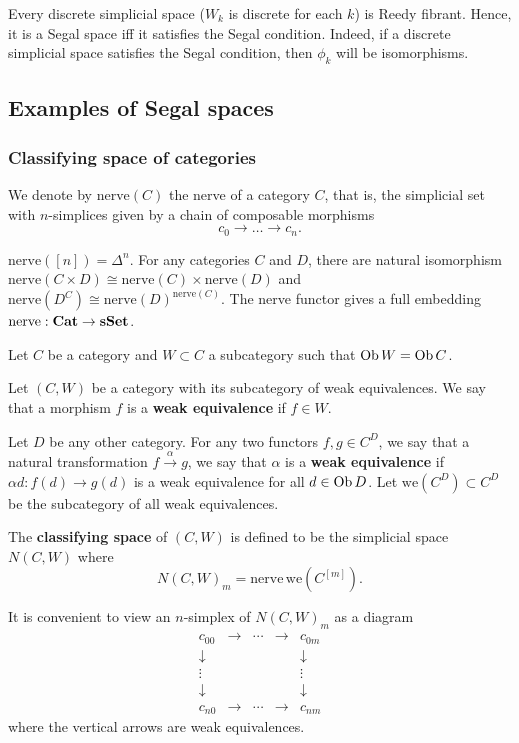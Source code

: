 \begin{refsection}
\begin{eg}
Every discrete simplicial space ($W_k$ is discrete for each $k$) is Reedy fibrant. Hence, it is a Segal space iff it satisfies the Segal condition. Indeed, if a discrete simplicial space satisfies the Segal condition, then $\phi_k$ will be isomorphisms.
\end{eg}

\subsection{Examples of Segal spaces}\label{egss}
\subsubsection{Classifying space of categories}
We denote by $\mathrm{nerve}(C)$ the nerve of a category $C$, that is, the simplicial set with $n$-simplices given by a chain of composable morphisms
$$c_0\to\ldots\to c_n.$$
\begin{prop}\label{nerve}
$\mathrm{nerve}([n])=\Delta^n$. For any categories $C$ and $D$, there are natural isomorphism $\mathrm{nerve}(C\times D)\cong\mathrm{nerve}(C)\times\mathrm{nerve}(D)$ and $\mathrm{nerve}(D^C)\cong\mathrm{nerve}(D)^{\mathrm{nerve}(C)}$. The nerve functor gives a full embedding $\mathrm{nerve}:\mathbf{Cat}\to\mathbf{sSet}$.
\end{prop}

Let $C$ be a category and $W\subset C$ a subcategory such that $\operatorname{Ob} W=\operatorname{Ob} C$.

\begin{defin}
Let $(C,W)$ be a category with its subcategory of weak equivalences. We say that a morphism $f$ is a \textbf{weak equivalence} if $f\in W$.

Let $D$ be any other category. For any two functors $f,g\in C^D$, we say that a natural transformation $f\xrightarrow{\alpha}g$, we say that $\alpha$ is a \textbf{weak equivalence} if $\alpha d \colon f(d) \to g(d)$ is a weak equivalence for all $d\in\operatorname{Ob} D$. Let $\mathrm{we}(C^D)\subset C^D$ be the subcategory of all weak equivalences.

The \textbf{classifying space} of $(C,W)$ is defined to be the simplicial space $N(C,W)$ where
\[
N(C,W)_m=\mathrm{nerve}\,\mathrm{we}(C^{[m]}).
\]
\end{defin}
It is convenient to view an $n$-simplex of $N(C,W)_m$ as a diagram
\begin{equation}\label{visualncw}
\begin{matrix} c_{00}&\to&\cdots&\to&c_{0m}\\\downarrow&&&&\downarrow\\\vdots&&&&\vdots\\\downarrow&&&&\downarrow\\c_{n0}&\to&\cdots&\to&c_{nm}
\end{matrix}
\end{equation}
where the vertical arrows are weak equivalences.


\end{refsection}
